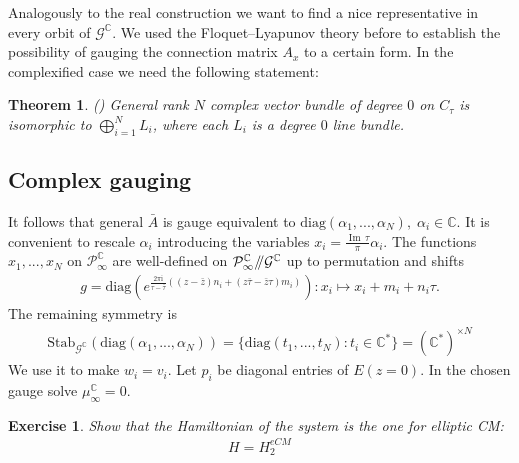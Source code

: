 \documentclass[12pt]{article}
\newtheorem{exer}{Exercise}[section]
\newtheorem{thm}{Theorem}[section]
\newcommand{\problemname}{}
\newenvironment{statement}[1]
 {\renewcommand{\problemname}{#1}\problem}
 {\endproblem}
\numberwithin{equation}{section}
\renewcommand{\Im}{{\operatorname{Im}\,}}
\theoremstyle{definition}
\newcommand {\ii} {\mathrm{i}}
\begin{document}
Analogously to the real construction we want to find a nice representative in every orbit of $\mathcal{G}^{\mathbb{C}}$. We used the Floquet--Lyapunov theory before to establish the possibility of gauging the connection matrix $A_x$ to a certain form. In the complexified case we need the following statement:
\begin{thm}
(\cite{Atiyah1957VectorBO}) General rank $N$ complex vector bundle of degree $0$ on $C_{\tau}$ is isomorphic to $\bigoplus\limits_{i = 1}^{N} L_i $, where each $L_i$ is a degree $0$ line bundle.
\end{thm}
\subsection{Complex gauging}
It follows that general $\bar{A}$ is gauge equivalent to $\mathrm{diag}(\alpha_1 , ... , \alpha_N), \; \alpha_{i} \in \mathbb{C} $. It is convenient to rescale $\alpha_i$ introducing the variables $x_i = \frac{\Im \tau}{\pi} \alpha_i$. The functions $ x_1 , ..., x_N$ on $\mathcal{P}_{\infty}^{\mathbb{C}}$ are well-defined on $\mathcal{P}_{\infty}^{\mathbb{C}} 
/\mkern-5mu/ \mathcal{G}^{\mathbb{C}}$ up to permutation and shifts
\begin{align*}
    g = \mathrm{diag}(e^{\frac{2 \pi {\ii}}{\tau - \bar{\tau}}((z - \bar{z})n_i + (z \bar{\tau} - \bar{z} \tau)m_i)}): x_i \mapsto x_i + m_i + n_i \tau.
\end{align*}
The remaining symmetry is
\begin{align*}
    \mathrm{Stab}_{\mathcal{G}^{\mathbb{C}}}(\mathrm{diag} (\alpha_1 , ..., \alpha_N )) = \{ \mathrm{diag}(t_1 , ..., t_N ) : t_i \in \mathbb{C}^{*} \} = (\mathbb{C}^{*})^{\times N}
\end{align*}
We use it to make $w_i = v_i$. Let $p_i$ be diagonal entries of $E(z = 0)$.
\begin{statement}{Problem 3}\normalfont\label{prob3}
 In the chosen gauge solve $\mu_{\infty}^{\mathbb{C}} = 0$.
\end{statement}
\begin{exer}\normalfont
Show that the Hamiltonian of the system is the one for elliptic CM:
\begin{align*}
     H = H_{2}^{eCM}
\end{align*}
\end{exer}
\end{document}
